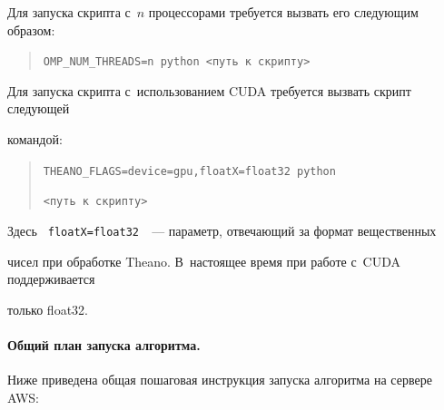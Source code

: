 Для запуска скрипта с~$n$ процессорами требуется вызвать его следующим образом:


\begin{quote}


\texttt{OMP\_NUM\_THREADS=n python <путь к~скрипту>}


\end{quote}





Для запуска скрипта с~использованием CUDA требуется вызвать скрипт следующей 


командой:


\begin{quote}


\texttt{THEANO\_FLAGS=device=gpu,floatX=float32 python}





\texttt{<путь к~скрипту> }


\end{quote}


Здесь \texttt{ floatX=float32 }~--- параметр, отвечающий за формат вещественных 


чисел при обработке Theano. В~настоящее время при работе с~CUDA поддерживается 


только float32.











\vspace*{-12pt}





\paragraph*{Общий план запуска алгоритма.}


Ниже приведена общая пошаговая инструкция запуска алгоритма на сервере AWS:


